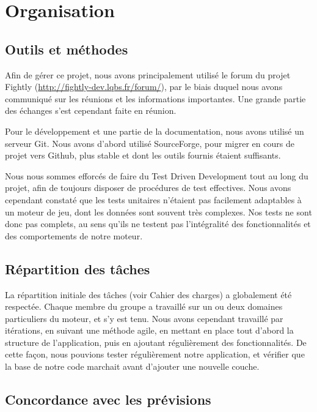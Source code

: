 \documentclass[a4paper,10pt]{report}
\begin{document}
  \chapter{Organisation}

    \section{Outils et méthodes}

    Afin de gérer ce projet, nous avons principalement utilisé le forum du projet Fightly (\url{http://fightly-dev.lqbs.fr/forum/}), par le biais duquel nous avons communiqué sur les réunions et les informations importantes. Une grande partie des échanges s'est cependant faite en réunion. 

    Pour le développement et une partie de la documentation, nous avons utilisé un serveur Git. Nous avons d'abord utilisé SourceForge, pour migrer en cours de projet vers Github, plus stable et dont les outils fournis étaient suffisants. 

    Nous nous sommes efforcés de faire du Test Driven Development tout au long du projet, afin de toujours disposer de procédures de test effectives. Nous avons cependant constaté que les tests unitaires n'étaient pas facilement adaptables à un moteur de jeu, dont les données sont souvent très complexes. Nos tests ne sont donc pas complets, au sens qu'ils ne testent pas l'intégralité des fonctionnalités et des comportements de notre moteur. 

    \section{Répartition des tâches}

    La répartition initiale des tâches (voir Cahier des charges) a globalement été respectée. Chaque membre du groupe a travaillé sur un ou deux domaines particuliers du moteur, et s'y est tenu. Nous avons cependant travaillé par itérations, en suivant une méthode agile, en mettant en place tout d'abord la structure de l'application, puis en ajoutant régulièrement des fonctionnalités. De cette façon, nous pouvions tester régulièrement notre application, et vérifier que la base de notre code marchait avant d'ajouter une nouvelle couche. 

    \section{Concordance avec les prévisions}
\end{document}
